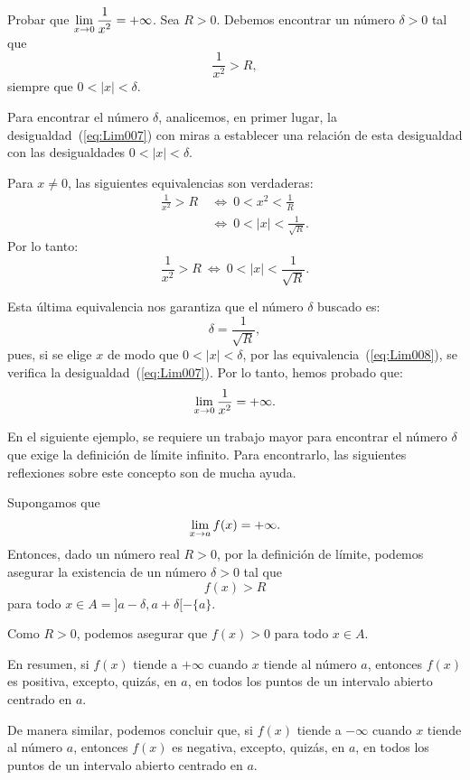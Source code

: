 \begin{exemplo}[Solución]{%
Probar que $\displaystyle\limjc{\frac{1}{x^2}}{x}{0} = +\infty$.} Sea $R > 0$. Debemos encontrar un
número $\delta > 0$ tal que
\begin{equation}
\label{eq:Lim007}
\frac{1}{x^2} > R,
\end{equation}
siempre que $0 < |x| < \delta$.

Para encontrar el número $\delta$, analicemos, en primer lugar, la desigualdad~(\ref{eq:Lim007})
con miras a establecer una relación de esta desigualdad con las desigualdades $0 < |x| < \delta$.

Para $x \neq 0$, las siguientes equivalencias son verdaderas:
\begin{align*}
\frac{1}{x^2} > R & \ \Leftrightarrow \ 0 < x^2 < \frac{1}{R} \\
  & \ \Leftrightarrow \ 0 < |x| < \frac{1}{\sqrt{R}}.
\end{align*}
Por lo tanto:
\begin{equation}
\label{eq:Lim008}
\frac{1}{x^2} > R \ \Leftrightarrow \ 0 < |x| < \frac{1}{\sqrt{R}}.
\end{equation}

Esta última equivalencia nos garantiza que el número $\delta$ buscado es:
\[
\delta = \frac{1}{\sqrt{R}},
\]
pues, si se elige $x$ de modo que $0 < |x| < \delta$, por las equivalencia~(\ref{eq:Lim008}), se
verifica la desigualdad~(\ref{eq:Lim007}). Por lo tanto, hemos probado que:
\[
\limjc{\frac{1}{x^2}}{x}{0} = +\infty.
\]
\end{exemplo}

En el siguiente ejemplo, se requiere un trabajo mayor para encontrar el número $\delta$ que exige
la definición de límite infinito. Para encontrarlo, las siguientes reflexiones sobre este concepto
son de mucha ayuda.

Supongamos que
\[
\limjc{f(x)}{x}{a} = +\infty.
\]
Entonces, dado un número real $R > 0$, por la definición de límite, podemos asegurar la existencia
de un número $\delta > 0$ tal que
\[
f(x) > R
\]
para todo $x \in A = ]a - \delta, a + \delta[ - \{a\}$.

Como $R > 0$, podemos asegurar que $f(x) > 0$ para todo $x \in A$.

En resumen, si $f(x)$ tiende a $+\infty$ cuando $x$ tiende al número $a$, entonces $f(x)$ es
positiva, excepto, quizás, en $a$, en todos los puntos de un intervalo abierto centrado en $a$.

De manera similar, podemos concluir que, si $f(x)$ tiende a $-\infty$ cuando $x$ tiende al
número $a$, entonces $f(x)$ es negativa, excepto, quizás, en $a$, en todos los puntos de un
intervalo abierto centrado en $a$.

